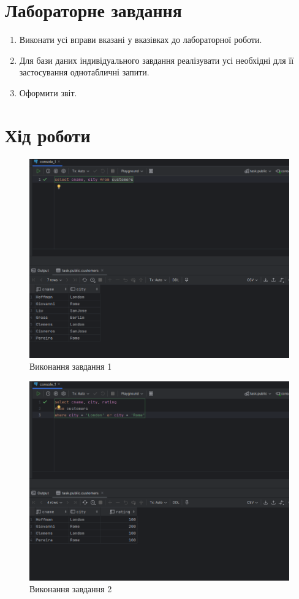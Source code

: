 \documentclass[14pt]{extreport}
\begin{document}
\begin{normalsize}
	\section*{Лабораторне завдання}
	\begin{enumerate}
		\item Виконати усі вправи вказані у вказівках до лабораторної роботи.
		\item Для бази даних індивідуального завдання реалізувати усі необхідні для її
		застосування однотабличні запити.
		\item Оформити звіт.
	\end{enumerate}
	
	\section*{Хід роботи}
	
	\begin{figure}[H]
		\centering
		\includegraphics[scale=0.45]{1}
		\caption{Виконання завдання 1}
	\end{figure}
	
	\begin{figure}[H]
		\centering
		\includegraphics[scale=0.45]{2}
		\caption{Виконання завдання 2}
	\end{figure}
	

\end{normalsize}
\end{document}
